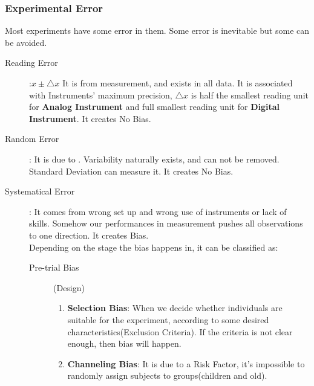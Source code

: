 \subsubsection{Experimental Error}
Most experiments have some error in them. Some error is inevitable but some can be avoided.
\begin{description}
    \item[Reading Error]:\( x\pm \triangle x \) It is from measurement, and exists in all data. It is associated with Instruments' maximum precision, \( \triangle x \) is half the smallest reading unit for \textbf{Analog Instrument} and full smallest reading unit for \textbf{Digital Instrument}. It creates No Bias.
    \item[Random Error]: It is due to . Variability naturally exists, and can not be removed. Standard Deviation can measure it. It creates No Bias.
    \item[Systematical Error]: It comes from wrong set up and wrong use of instruments or lack of skills. Somehow our performances in measurement pushes all observations to one direction. It creates Bias.\\ Depending on the stage the bias happens in, it can be classified as:
\begin{description}
    \item[Pre-trial Bias](Design)
    \begin{enumerate}
        \item \textbf{Selection Bias}: When we decide whether individuals are suitable for the experiment, according to some desired characteristics(Exclusion Criteria). If the criteria is not clear enough, then bias will happen.
        \item \textbf{Channeling Bias}: It is due to a Risk Factor, it's impossible to randomly assign subjects to groups(children and old).
        

\end{enumerate}
\end{description}
\end{description}
